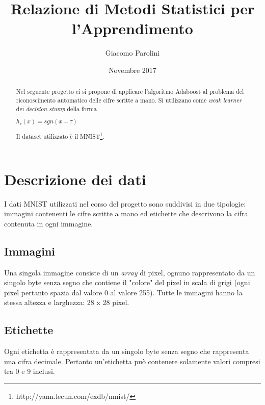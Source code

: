 \documentclass[12pt, letterpaper]{article}
\title{Relazione di Metodi Statistici per l'Apprendimento}
\author{Giacomo Parolini}
\date{Novembre 2017}
\begin{document}
\begin{titlepage}
\maketitle
\end{titlepage}

\begin{abstract}
\noindent
Nel seguente progetto ci si propone di applicare l'algoritmo Adaboost al problema del riconoscimento automatico delle cifre scritte a mano. 
Si utilizzano come {\it weak learner} dei {\it decision stump} della forma
\begin{center}
	\( h_\tau(x) = sgn(x - \tau) \)
\end{center}
Il dataset utilizzato \`e il MNIST\footnote{http://yann.lecun.com/exdb/mnist/}.
\end{abstract}


\section{Descrizione dei dati}
I dati MNIST utilizzati nel corso del progetto sono suddivisi in due tipologie: immagini contenenti le cifre scritte a mano ed etichette che descrivono la cifra contenuta in ogni immagine.

\subsection{Immagini}
Una singola immagine consiste di un {\it array} di pixel, ognuno rappresentato da un singolo byte senza segno che contiene il "colore" del pixel in scala di grigi (ogni pixel pertanto spazia dal valore 0 al valore 255). Tutte le immagini hanno la stessa altezza e larghezza: 28 x 28 pixel.

\subsection{Etichette}
Ogni etichetta \`e rappresentata da un singolo byte senza segno che rappresenta una cifra decimale. Pertanto un'etichetta pu\`o contenere solamente valori compresi tra 0 e 9 inclusi.
\end{document}
